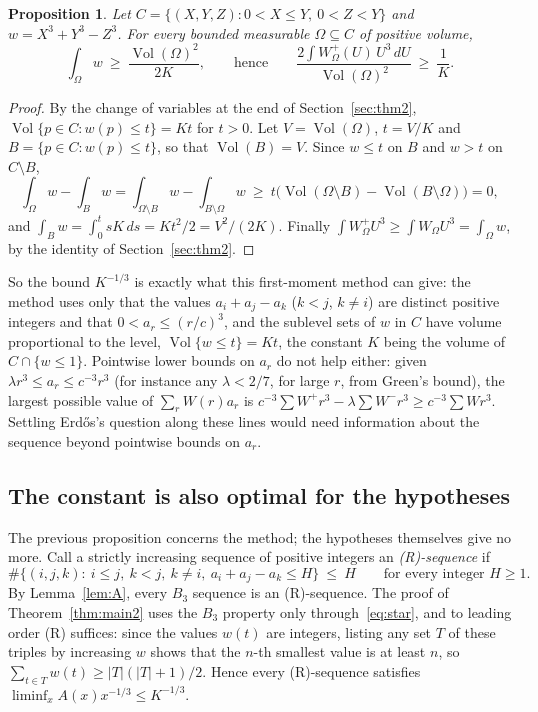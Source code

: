 \documentclass[11pt]{amsart}
\newtheorem{proposition}{Proposition}[section]
\theoremstyle{remark}
\newcommand{\Vol}{\operatorname{Vol}}
\begin{document}
\begin{proposition}\label{prop:optimal}
Let $C=\{(X,Y,Z):0<X\le Y,\ 0<Z<Y\}$ and $w=X^3+Y^3-Z^3$. For every bounded measurable $\Omega\subseteq C$ of positive volume,
\[
\int_\Omega w\ \ge\ \frac{\Vol(\Omega)^2}{2K},\qquad\text{hence}\qquad \frac{2\int W_\Omega^+(U)\,U^3\,dU}{\Vol(\Omega)^2}\ \ge\ \frac1K.
\]
\end{proposition}

\begin{proof}
By the change of variables at the end of Section~\ref{sec:thm2}, $\Vol\{p\in C:w(p)\le t\}=Kt$ for $t>0$. Let $V=\Vol(\Omega)$, $t=V/K$ and $B=\{p\in C:w(p)\le t\}$, so that $\Vol(B)=V$. Since $w\le t$ on $B$ and $w>t$ on $C\setminus B$,
\[
\int_\Omega w-\int_Bw=\int_{\Omega\setminus B}w-\int_{B\setminus\Omega}w\ \ge\ t\bigl(\Vol(\Omega\setminus B)-\Vol(B\setminus\Omega)\bigr)=0,
\]
and $\int_Bw=\int_0^tsK\,ds=Kt^2/2=V^2/(2K)$. Finally $\int W_\Omega^+U^3\ge\int W_\Omega U^3=\int_\Omega w$, by the identity of Section~\ref{sec:thm2}.
\end{proof}

So the bound $K^{-1/3}$ is exactly what this first-moment method can give: the method uses only that the values $a_i+a_j-a_k$ ($k<j$, $k\neq i$) are distinct positive integers and that $0<a_r\le(r/c)^3$, and the sublevel sets of $w$ in $C$ have volume proportional to the level, $\Vol\{w\le t\}=Kt$, the constant $K$ being the volume of $C\cap\{w\le1\}$. Pointwise lower bounds on $a_r$ do not help either: given $\lambda r^3\le a_r\le c^{-3}r^3$ (for instance any $\lambda<2/7$, for large $r$, from Green's bound), the largest possible value of $\sum_rW(r)a_r$ is $c^{-3}\sum W^+r^3-\lambda\sum W^-r^3\ge c^{-3}\sum Wr^3$. Settling Erd\H{o}s's question along these lines would need information about the sequence beyond pointwise bounds on $a_r$.

\subsection{The constant is also optimal for the hypotheses}
The previous proposition concerns the method; the hypotheses themselves give no more. Call a strictly increasing sequence of positive integers an \emph{(R)-sequence} if
\[
\#\{(i,j,k):\ i\le j,\ k<j,\ k\neq i,\ a_i+a_j-a_k\le H\}\ \le\ H\qquad\text{for every integer }H\ge1.\tag{R}
\]
By Lemma~\ref{lem:A}, every $B_3$ sequence is an (R)-sequence. The proof of Theorem~\ref{thm:main2} uses the $B_3$ property only through~\eqref{eq:star}, and to leading order (R) suffices: since the values $w(t)$ are integers, listing any set $T$ of these triples by increasing $w$ shows that the $n$-th smallest value is at least $n$, so $\sum_{t\in T}w(t)\ge|T|(|T|+1)/2$. Hence every (R)-sequence satisfies $\liminf_xA(x)x^{-1/3}\le K^{-1/3}$.
\end{document}
